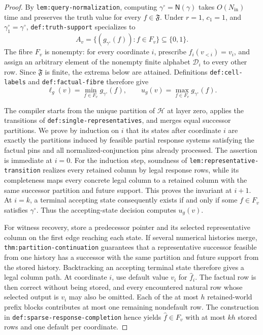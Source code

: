 \documentclass{article}
\begin{document}
\begin{proof}
By \texttt{lem:query-normalization}, computing \(\gamma^{\circ}=\mathsf N(\gamma)\) takes \(O(N_{\mathrm{in}})\) time and preserves the truth value for every \(f\in\mathfrak F\).  Under \(r=1\), \(c_1=1\), and \(\gamma_1^{\circ}=\gamma^{\circ}\), \texttt{def:truth-support} specializes to
\[
 A_v=\{(g_{\gamma^{\circ}}(f)):f\in F_v\}\subseteq\{0,1\}.
\]
The fibre \(F_v\) is nonempty: for every coordinate \(i\), prescribe \(f_i(v_{<i})=v_i\), and assign an arbitrary element of the nonempty finite alphabet \(\mathcal D_i\) to every other row.  Since \(\mathfrak F\) is finite, the extrema below are attained.  Definitions \texttt{def:cell-labels} and \texttt{def:factual-fibre} therefore give
\[
 \ell_g(v)=\min_{f\in F_v}g_{\gamma^{\circ}}(f),
 \qquad
 u_g(v)=\max_{f\in F_v}g_{\gamma^{\circ}}(f).
\tag{4}
\]

The compiler starts from the unique partition of \(\mathcal H\) at layer zero, applies the transitions of \texttt{def:single-representatives}, and merges equal successor partitions.  We prove by induction on \(i\) that its states after coordinate \(i\) are exactly the partitions induced by feasible partial response systems satisfying the factual pins and all normalized-conjunction pins already processed.  The assertion is immediate at \(i=0\).  For the induction step, soundness of \texttt{lem:representative-transition} realizes every retained column by legal response rows, while its completeness maps every concrete legal column to a retained column with the same successor partition and future support.  This proves the invariant at \(i+1\).  At \(i=k\), a terminal accepting state consequently exists if and only if some \(f\in F_v\) satisfies \(\gamma^{\circ}\).  Thus the accepting-state decision computes \(u_g(v)\).

For witness recovery, store a predecessor pointer and its selected representative column on the first edge reaching each state.  If several numerical histories merge, \texttt{thm:partition-continuation} guarantees that a representative successor feasible from one history has a successor with the same partition and future support from the stored history.  Backtracking an accepting terminal state therefore gives a legal column path.  At coordinate \(i\), use default value \(v_i\) for \(\widehat f_i\).  The factual row is then correct without being stored, and every encountered natural row whose selected output is \(v_i\) may also be omitted.  Each of the at most \(h\) retained-world prefix blocks contributes at most one remaining nondefault row.  The construction in \texttt{def:sparse-response-completion} hence yields \(\widehat f\in F_v\) with at most \(kh\) stored rows and one default per coordinate.


\end{proof}
\end{document}
